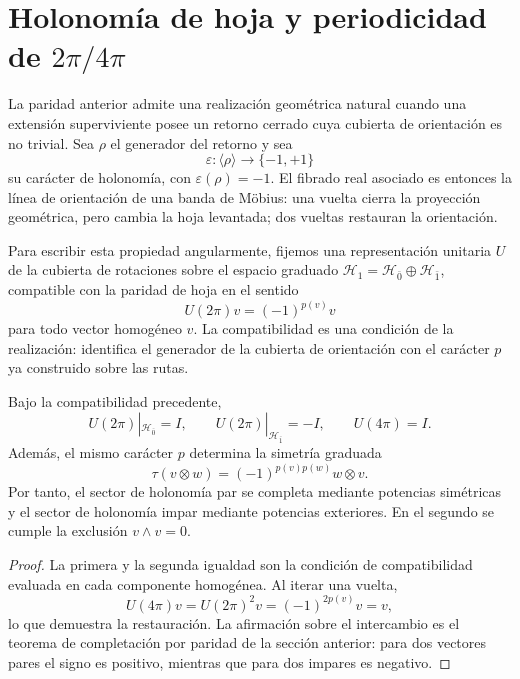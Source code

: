 \section{Holonomía de hoja y periodicidad de \texorpdfstring{\(2\pi/4\pi\)}{2pi/4pi}}

La paridad anterior admite una realización geométrica natural cuando una
extensión superviviente posee un retorno cerrado cuya cubierta de orientación
es no trivial. Sea \(\rho\) el generador del retorno y sea
\[
 \varepsilon:\langle\rho\rangle\longrightarrow\{-1,+1\}
\]
su carácter de holonomía, con \(\varepsilon(\rho)=-1\). El fibrado real
asociado es entonces la línea de orientación de una banda de Möbius: una
vuelta cierra la proyección geométrica, pero cambia la hoja levantada; dos
vueltas restauran la orientación.

Para escribir esta propiedad angularmente, fijemos una representación
unitaria \(U\) de la cubierta de rotaciones sobre el espacio graduado
\(\mathcal H_1=\mathcal H_{\bar0}\oplus\mathcal H_{\bar1}\), compatible con
la paridad de hoja en el sentido
\[
 U(2\pi)v=(-1)^{p(v)}v
\]
para todo vector homogéneo \(v\). La compatibilidad es una condición de la
realización: identifica el generador de la cubierta de orientación con el
carácter \(p\) ya construido sobre las rutas.

\begin{theorem}
\label{thm:dos-cuatro-pi-estadistica}
Bajo la compatibilidad precedente,
\[
 U(2\pi)|_{\mathcal H_{\bar0}}=I,
 \qquad
 U(2\pi)|_{\mathcal H_{\bar1}}=-I,
 \qquad
 U(4\pi)=I.
\]
Además, el mismo carácter \(p\) determina la simetría graduada
\[
 \tau(v\otimes w)=(-1)^{p(v)p(w)}w\otimes v.
\]
Por tanto, el sector de holonomía par se completa mediante potencias
simétricas y el sector de holonomía impar mediante potencias exteriores. En
el segundo se cumple la exclusión \(v\wedge v=0\).
\end{theorem}

\begin{proof}
La primera y la segunda igualdad son la condición de compatibilidad evaluada
en cada componente homogénea. Al iterar una vuelta,
\[
 U(4\pi)v=U(2\pi)^2v=(-1)^{2p(v)}v=v,
\]
lo que demuestra la restauración. La afirmación sobre el intercambio es el
teorema de completación por paridad de la sección anterior: para dos vectores
pares el signo es positivo, mientras que para dos impares es negativo.
\end{proof}

